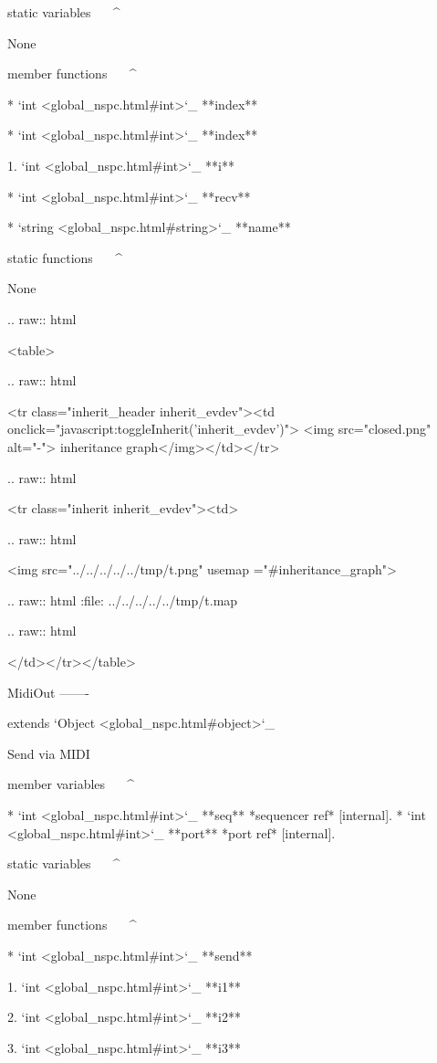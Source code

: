 static variables
^^^^^^^^^^^^^^^^

	None

member functions
^^^^^^^^^^^^^^^^

	* `int <global_nspc.html#int>`_ **index**

	* `int <global_nspc.html#int>`_ **index**

		1. `int <global_nspc.html#int>`_ **i**

	* `int <global_nspc.html#int>`_ **recv**

	* `string <global_nspc.html#string>`_ **name**

static functions
^^^^^^^^^^^^^^^^


	None


  .. raw:: html

   <table>


  .. raw:: html

   <tr class="inherit_header inherit_evdev"><td onclick="javascript:toggleInherit('inherit_evdev')"> <img src="closed.png" alt="-"> inheritance graph</img></td></tr>


  .. raw:: html

   <tr class="inherit inherit_evdev"><td>


  .. raw:: html

   <img src="../../../../../tmp/t.png" usemap ="#inheritance_graph">


  .. raw:: html
   :file:   ../../../../../tmp/t.map


  .. raw:: html

   </td></tr></table>

MidiOut
-------

extends `Object <global_nspc.html#object>`_ 

Send via MIDI

member variables
^^^^^^^^^^^^^^^^

	* `int <global_nspc.html#int>`_ **seq** *sequencer ref*  [internal].
	* `int <global_nspc.html#int>`_ **port** *port ref*  [internal].


static variables
^^^^^^^^^^^^^^^^

	None

member functions
^^^^^^^^^^^^^^^^

	* `int <global_nspc.html#int>`_ **send**

		1. `int <global_nspc.html#int>`_ **i1**

		2. `int <global_nspc.html#int>`_ **i2**

		3. `int <global_nspc.html#int>`_ **i3**


